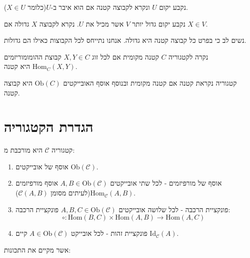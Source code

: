 \documentclass{tstextbook}
\begin{document}
\begin{definition}
נקבע יקום \(U\) ונקרא לקבוצה קטנה אם הוא איבר ב-\(U\)(כלומר \(X \in U\)).

\end{definition}
\begin{definition}
נקבע יקום גדול יותר \(V\) אשר מכיל את \(U\). נקרא לקבוצה \(X\) גדולה אם \(X \in V\).

\end{definition}
\begin{remark}
נשים לב כי בפרט כל קבוצה קטנה היא גדולה. אנחנו נתייחס לכל הקבוצות כאילו הם גדולות. 

\end{remark}
\begin{definition}
נקרה לקטגוריה \(C\) קטנה מקומית אם לכל זוג \(X,Y \in C\) קבוצת ההומומוריזמים \(\mathrm{Hom}_{C}(X,Y)\) היא קטנה.

\end{definition}
\begin{definition}
קטגוריה נקראת קטנה אם קטנה מקומית ובנוסף אוסף האובייקטים \(\mathrm{Ob}(C)\) היא קבוצה קטנה.

\end{definition}
\section{הגדרת הקטגוריה}

\begin{definition}[קטגוריה]
קטגוריה \(\mathcal{C}\) היא מורכבת מ:

  \begin{enumerate}
    \item אוסף של אובייקטים \(\mathrm{Ob}(\mathcal{C})\). 


    \item אוסף של מורפיזמים - לכל שתי אובייקטים \(A,B\in \mathrm{Ob}(\mathcal{C})\) אוסף מורפיזמים \(\mathrm{Hom}_{\mathcal{C}}(A,B)\)(לעיתים מסומן \(\mathcal{C}(A,B)\)). 


    \item פונקציית הרכבה - לכל שלושה אובייקטים \(A,B,C \in \mathrm{Ob}(\mathcal{C})\) פונקציית הרכבה: 
$$\circ :\mathrm{Hom}(B,C)\times \mathrm{Hom}(A,B)\to \mathrm{Hom}(A,C)$$


    \item פונקציית זהות - לכל אובייקט \(A \in \mathrm{Ob}(\mathcal{C})\) קיים \(\mathrm{Id}_{\mathcal{C}}(A)\). 


  \end{enumerate}
\end{definition}
אשר מקיים את התכונות:
\end{document}
